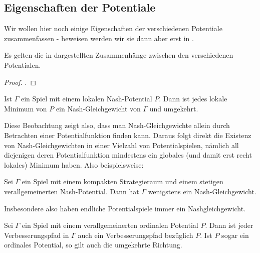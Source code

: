 \subsection{Eigenschaften der Potentiale}

Wir wollen hier noch einige Eigenschaften der verschiedenen Potentiale zusammenfassen - beweisen werden wir sie dann aber erst in .

\begin{satz}\label{satz:ZusammenaengePotentiale}
	Es gelten die in  dargestellten Zusammenhänge zwischen den verschiedenen Potentialen.
\end{satz}

\begin{proof}.
	
\end{proof}

\begin{beob}\label{beob:lokMinNG}
	Ist $\Gamma$ ein Spiel mit einem lokalen Nash-Potential $P$. Dann ist jedes lokale Minimum von $P$ ein Nash-Gleichgewicht von $\Gamma$ und umgekehrt.
\end{beob}

Diese Beobachtung zeigt also, dass man Nash-Gleichgewichte allein durch Betrachten einer Potentialfunktion finden kann. Daraus folgt direkt die Existenz von Nash-Gleichgewichten in einer Vielzahl von Potentialspielen, nämlich all diejenigen deren Potentialfunktion mindestens ein globales (und damit erst recht lokales) Minimum haben. Also beispielsweise:

\begin{kor}
	Sei $\Gamma$ ein Spiel mit einem kompakten Strategieraum und einem stetigen verallgemeinerten Nash-Potential. Dann hat $\Gamma$ wenigstens ein Nash-Gleichgewicht.
\end{kor}

Insbesondere also haben endliche Potentialspiele immer ein Nashgleichgewicht. 

\begin{satz}\label{prop:ordPotVerbpfad}
	Sei $\Gamma$ ein Spiel mit einem verallgemeinerten ordinalen Potential $P$. Dann ist jeder Verbesserungspfad in $\Gamma$ auch ein Verbesserungspfad bezüglich $P$. Ist $P$ sogar ein ordinales Potential, so gilt auch die umgekehrte Richtung.
\end{satz}

